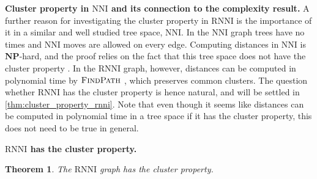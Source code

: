 \documentclass[11pt]{amsart}
\newtheorem{theorem}{Theorem}
\newcommand{\tocite}{ {\color{red}\fbox{CITATION}} }
\newcommand{\rnni}{\mathrm{RNNI}}
\newcommand{\findpath}{\textsc{FindPath}}
\newcommand{\nni}{\mathrm{NNI}}
\newcommand{\np}{\mathbf{NP}}
\newcommand{\summary}[1]{\textbf{#1}} %
\begin{document}
\summary{Cluster property in $\nni$ and its connection to the complexity result.}
A further reason for investigating the cluster property in $\rnni$ is the importance of it in a similar and well studied \tocite tree space, $\nni$.
In the $\nni$ graph trees have no times and $\nni$ moves are allowed on every edge.
Computing distances in $\nni$ is $\np$-hard\autocite{Dasgupta2000-xa}, and the proof relies on the fact that this tree space does not have the cluster property \autocite{Li1996-zw}.
In the $\rnni$ graph, however, distances can be computed in polynomial time by $\findpath$ \autocite{Collienne2020-iu}, which preserves common clusters.
The question whether $\rnni$ has the cluster property is hence natural, and will be settled in \autoref{thm:cluster_property_rnni}.
Note that even though it seems like distances can be computed in polynomial time in a tree space if it has the cluster property, this does not need to be true in general.

\summary{$\rnni$ has the cluster property.}
\begin{theorem}
	The $\rnni$ graph has the cluster property.
	\label{thm:cluster_property_rnni}
\end{theorem}
\end{document}

